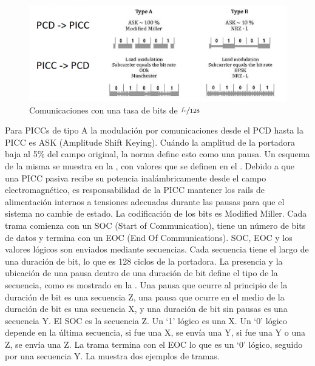 \documentclass[a4paper, twoside, 11pt]{report}
\begin{document}
\begin{figure}[htb]
\centering
\includegraphics[scale=0.47]{./img/modulation_and_bit_encoding}
\caption{Comunicaciones con una tasa de bits de $\nicefrac{f_c}{128}$~\cite[Adaptado de][]{iso14443-2}}
\label{fig:mod-encode}
\end{figure}

Para PICCs de tipo A la modulación por comunicaciones desde el PCD hasta la PICC es ASK (Amplitude Shift Keying). Cuándo la amplitud de la portadora baja al 5\% del campo original, la norma define esto como una pausa. Un esquema de la misma se muestra en la , con valores que se definen en el . Debido a que una PICC pasiva recibe su potencia inalámbricamente desde el campo electromagnético, es responsabilidad de la PICC mantener los rails de alimentación internos a tensiones adecuadas durante las pausas para que el sistema no cambie de estado. La codificación de los bits es Modified Miller. Cada trama comienza con un SOC (Start of Communication), tiene un número de bits de datos y termina con un EOC (End Of Communications). SOC, EOC y los valores lógicos son enviados mediante secuencias. Cada secuencia tiene el largo de una duración de bit, lo que es 128 ciclos de la portadora. La presencia y la ubicación de una pausa dentro de una duración de bit define el tipo de la secuencia, como es mostrado en la . Una pausa que ocurre al principio de la duración de bit es una secuencia Z, una pausa que ocurre en el medio de la duración de bit es una secuencia X, y una duración de bit sin pausas es una secuencia Y. El SOC es la secuencia Z. Un ‘1’ lógico es una X. Un ‘0’ lógico depende en la última secuencia, si fue una X, se envía una Y, si fue una Y o una Z, se envía una Z. La trama termina con el EOC lo que es un ‘0’ lógico, seguido por una secuencia Y. La  muestra dos ejemplos de tramas.
\end{document}
